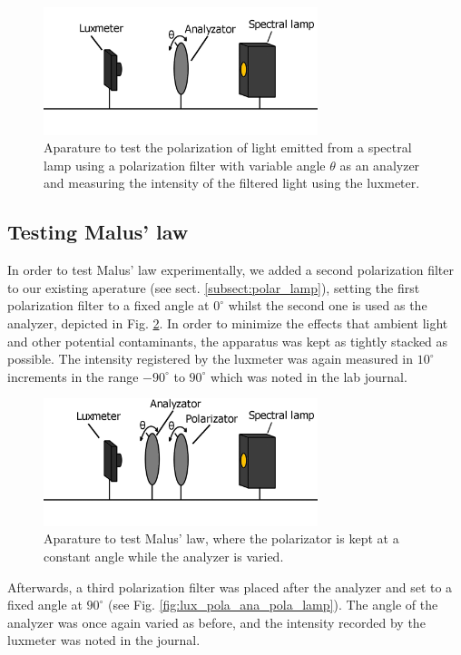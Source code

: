 \documentclass[11pt,a4paper,twocolumn]{article}
\begin{document}
  \begin{figure}[H]
    \center
    \includegraphics[width=8cm]{scripts/figs/diagram_1.png}
    \caption{Aparature to test the polarization of light emitted from a spectral lamp using a polarization filter with variable angle $\theta$ as an analyzer and measuring the intensity of the filtered light using the luxmeter.}
    \label{fig:lux_ana_lamp}
  \end{figure}

  \subsection{Testing Malus' law}

    In order to test Malus' law experimentally, we added a second polarization filter to our existing aperature (see sect. \ref{subsect:polar_lamp}), setting the first polarization filter to a fixed angle at $0^\circ$ whilst the second one is used as the analyzer, depicted in Fig. \ref{fig:lux_ana_pola_lamp}. In order to minimize the effects that ambient light and other potential contaminants, the apparatus was kept as tightly stacked as possible. The intensity registered by the luxmeter was again measured in $10^\circ$ increments in the range $-90^\circ$ to $90^\circ$ which was noted in the lab journal. 

    \begin{figure}[H]
      \center
      \includegraphics[width=8cm]{scripts/figs/diagram_2.png}
      \caption{Aparature to test Malus' law, where the polarizator is kept at a constant angle while the analyzer is varied.}
      \label{fig:lux_ana_pola_lamp}
    \end{figure}

    Afterwards, a third polarization filter was placed after the analyzer and set to a fixed angle at $90^\circ$ (see Fig. \ref{fig:lux_pola_ana_pola_lamp}). The angle of the analyzer was once again varied as before, and the intensity recorded by the luxmeter was noted in the journal.
\end{document}
